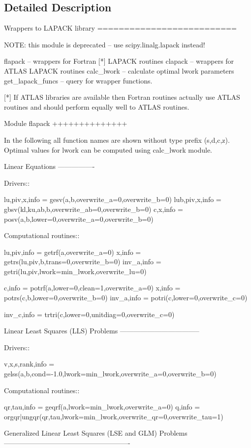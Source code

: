 \subsection{Detailed Description}
\begin{DoxyVerb}Wrappers to LAPACK library
==========================

NOTE: this module is deprecated -- use scipy.linalg.lapack instead!

  flapack -- wrappers for Fortran [*] LAPACK routines
  clapack -- wrappers for ATLAS LAPACK routines
  calc_lwork -- calculate optimal lwork parameters
  get_lapack_funcs -- query for wrapper functions.

[*] If ATLAS libraries are available then Fortran routines
    actually use ATLAS routines and should perform equally
    well to ATLAS routines.

Module flapack
++++++++++++++

In the following all function names are shown without
type prefix (s,d,c,z). Optimal values for lwork can
be computed using calc_lwork module.

Linear Equations
----------------

  Drivers::

    lu,piv,x,info = gesv(a,b,overwrite_a=0,overwrite_b=0)
    lub,piv,x,info = gbsv(kl,ku,ab,b,overwrite_ab=0,overwrite_b=0)
    c,x,info = posv(a,b,lower=0,overwrite_a=0,overwrite_b=0)

  Computational routines::

    lu,piv,info = getrf(a,overwrite_a=0)
    x,info = getrs(lu,piv,b,trans=0,overwrite_b=0)
    inv_a,info = getri(lu,piv,lwork=min_lwork,overwrite_lu=0)

    c,info = potrf(a,lower=0,clean=1,overwrite_a=0)
    x,info = potrs(c,b,lower=0,overwrite_b=0)
    inv_a,info = potri(c,lower=0,overwrite_c=0)

    inv_c,info = trtri(c,lower=0,unitdiag=0,overwrite_c=0)

Linear Least Squares (LLS) Problems
-----------------------------------

  Drivers::

    v,x,s,rank,info = gelss(a,b,cond=-1.0,lwork=min_lwork,overwrite_a=0,overwrite_b=0)

  Computational routines::

    qr,tau,info = geqrf(a,lwork=min_lwork,overwrite_a=0)
    q,info = orgqr|ungqr(qr,tau,lwork=min_lwork,overwrite_qr=0,overwrite_tau=1)

Generalized Linear Least Squares (LSE and GLM) Problems
-------------------------------------------------------


\end{DoxyVerb}
